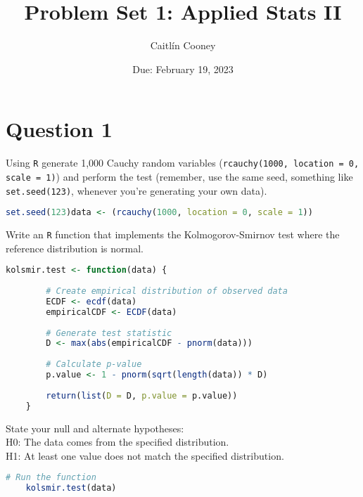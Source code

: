 \documentclass[12pt,letterpaper]{article}
\title{Problem Set 1: Applied Stats II}
\date{Due: February 19, 2023}
\author{Caitlín Cooney}
\begin{document}
	\maketitle
	\vspace{.25cm}
\section*{Question 1} 
\vspace{.25cm}


\noindent Using \texttt{R} generate 1,000 Cauchy random variables (\texttt{rcauchy(1000, location = 0, scale = 1)}) and perform the test (remember, use the same seed, something like \texttt{set.seed(123)}, whenever you're generating your own data).\\

\begin{lstlisting}[language=R]
	set.seed(123)data <- (rcauchy(1000, location = 0, scale = 1)) \end{lstlisting}
	
\noindent  Write an \texttt{R} function that implements the Kolmogorov-Smirnov test where the reference distribution is normal. \\
	

\begin{lstlisting}[language=R]
 	kolsmir.test <- function(data) { 
		
		# Create empirical distribution of observed data  
		ECDF <- ecdf(data)  
		empiricalCDF <- ECDF(data)    
		
		# Generate test statistic  
		D <- max(abs(empiricalCDF - pnorm(data)))    
		
		# Calculate p-value  
		p.value <- 1 - pnorm(sqrt(length(data)) * D)    
		
		return(list(D = D, p.value = p.value))
	}\end{lstlisting}


\noindent State your null and alternate hypotheses: \\

\indent H0: The data comes from the specified distribution.\\

\indent H1: At least one value does not match the specified distribution.\\


\begin{lstlisting}[language=R]
	# Run the function
	kolsmir.test(data) \end{lstlisting}
\end{document}
